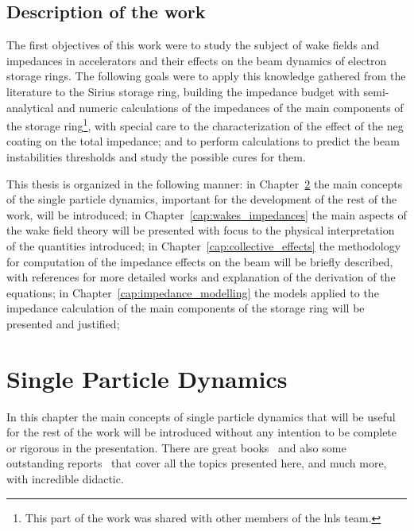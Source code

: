 \section{Description of the work}

    The first objectives of this work were to study the subject of wake fields and impedances in accelerators and their effects on the beam dynamics of electron storage rings. The following goals were to apply this knowledge gathered from the literature to the Sirius storage ring, building the impedance budget with semi-analytical and numeric calculations of the impedances of the main components of the storage ring\footnote{This part of the work was shared with other members of the \gls{lnls} team.}, with special care to the characterization of the effect of the \gls{neg} coating on the total impedance; and to perform calculations to predict the beam instabilities thresholds and study the possible cures for them.

    This thesis is organized in the following manner: in Chapter~\ref{cap:single_particle_dynamics} the main concepts of the single particle dynamics, important for the development of the rest of the work, will be introduced; in Chapter~\ref{cap:wakes_impedances} the main aspects of the wake field theory will be presented with focus to the physical interpretation of the quantities introduced; in Chapter~\ref{cap:collective_effects} the methodology for computation of the impedance effects on the beam will be briefly described, with references for more detailed works and explanation of the derivation of the equations; in Chapter~\ref{cap:impedance_modelling} the models applied to the impedance calculation of the main components of the storage ring will be presented and justified;


\chapter{Single Particle Dynamics}\label{cap:single_particle_dynamics}

    In this chapter the main concepts of single particle dynamics that will be useful for the rest of the work will be introduced without any intention to be complete or rigorous in the presentation. There are great books~\cite{LeeBook,WiedemannBook} and also some outstanding reports~\cite{Sands1969Int} that cover all the topics presented here, and much more, with incredible didactic.

